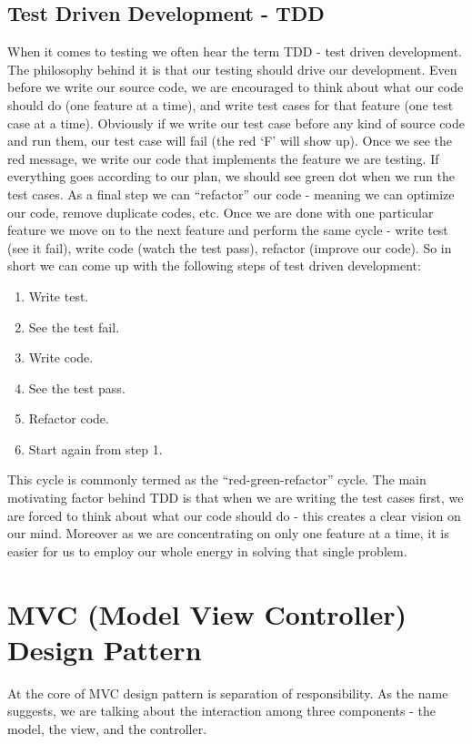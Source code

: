 \documentclass{article}
\begin{document}
\subsection{Test Driven Development - TDD}
When it comes to testing we often hear the term TDD - test driven development.
The philosophy behind it is that our testing should drive our development.
Even before we write our source code, we are encouraged to think about what our code should do (one feature at a time), 
and write test cases for that feature (one test case at a time).
Obviously if we write our test case before any kind of source code and run them, our test case will fail (the red `F' will show up).
Once we see the red message, we write our code that implements the feature we are testing.
If everything goes according to our plan, we should see green dot when we run the test cases.
As a final step we can ``refactor'' our code - meaning we can optimize our code, remove duplicate codes, etc.
Once we are done with one particular feature we move on to the next feature and perform the same cycle - 
write test (see it fail), write code (watch the test pass), refactor (improve our code).
So in short we can come up with the following steps of test driven development: 
\begin{enumerate}
	\item Write test.
	\item See the test fail.
	\item Write code.
	\item See the test pass.
	\item Refactor code.
	\item Start again from step 1.
\end{enumerate}
This cycle is commonly termed as the ``red-green-refactor'' cycle.
The main motivating factor behind TDD is that when we are writing the test cases first, we are forced to think about
what our code should do - this creates a clear vision on our mind. Moreover as we are concentrating on only one feature at a time,
it is easier for us to employ our whole energy in solving that single problem.

\section{MVC (Model View Controller) Design Pattern}
At the core of MVC design pattern is separation of responsibility.
As the name suggests, we are talking about the interaction among three components - the model, the view, and the controller.
\end{document}
